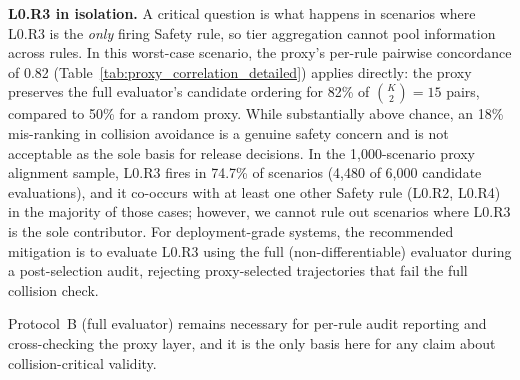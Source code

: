 \noindent\textbf{L0.R3 in isolation.}  A critical question is what happens in scenarios where L0.R3 is the \emph{only} firing Safety rule, so tier aggregation cannot pool information across rules.  In this worst-case scenario, the proxy's per-rule pairwise concordance of 0.82 (Table~\ref{tab:proxy_correlation_detailed}) applies directly: the proxy preserves the full evaluator's candidate ordering for 82\% of $\binom{K}{2}{=}15$ pairs, compared to 50\% for a random proxy.  While substantially above chance, an 18\% mis-ranking in collision avoidance is a genuine safety concern and is not acceptable as the sole basis for release decisions.  In the 1{,}000-scenario proxy alignment sample, L0.R3 fires in 74.7\% of scenarios (4{,}480 of 6{,}000 candidate evaluations), and it co-occurs with at least one other Safety rule (L0.R2, L0.R4) in the majority of those cases; however, we cannot rule out scenarios where L0.R3 is the sole contributor.  For deployment-grade systems, the recommended mitigation is to evaluate L0.R3 using the full (non-differentiable) evaluator during a post-selection audit, rejecting proxy-selected trajectories that fail the full collision check.

Protocol~B (full evaluator) remains necessary for per-rule audit reporting and cross-checking the proxy layer, and it is the only basis here for any claim about collision-critical validity.

